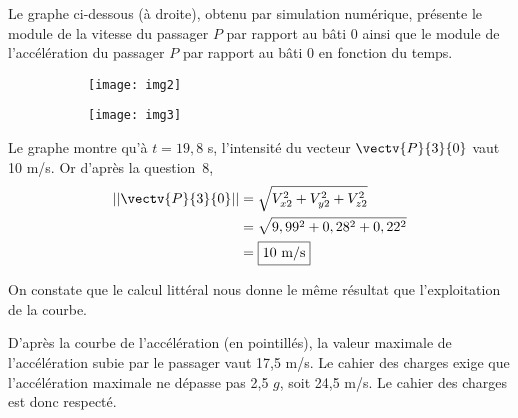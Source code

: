 Le graphe ci-dessous (à droite), obtenu par simulation numérique, présente le module de la vitesse du passager $P$ par rapport au bâti 0 ainsi que le module de l'accélération du passager $P$ par rapport au bâti 0 en fonction du temps. 

\begin{figure*}[!h]
\centering
\begin{subfigure}{.7\textwidth}
  \centering
  \texttt{[image: img2]}
\end{subfigure}%
\hfill
\begin{subfigure}{.7\textwidth}
  \centering
  \texttt{[image: img3]}
\end{subfigure}
\end{figure*}


\ifprof
\begin{corrige}

Le graphe montre qu'à $t=19,8$ s, l'intensité du vecteur $\vectv{P}{3}{0}$ vaut 10 m/s. Or  d'après la question~8, 
\begin{align*}
\left|\left|\vectv{P}{3}{0}\right|\right|&=\sqrt{V_{x2}^2+V_{y2}^2+V_{z2}^2}\\
	&=\sqrt{9,99^2+0,28^2+0,22^2}\\
	&=\boxed{10\text{ m/s} }
\end{align*}

On constate que le calcul littéral nous donne le même résultat que l'exploitation de la courbe.

\end{corrige}\else\fi

\ifprof
\begin{corrige}
D'après la courbe de l'accélération (en pointillés), la valeur maximale de l'accélération subie par le passager vaut 17,5 m/s. Le cahier des charges exige que l'accélération maximale ne dépasse pas 2,5 $g$, soit 24,5 m/s. Le cahier des charges est donc respecté.

\end{corrige}\else\fi

